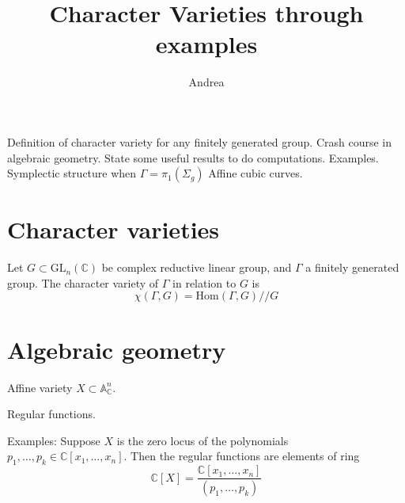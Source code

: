 
% 


\title{Character Varieties through examples}
\author{Andrea}
\date{}

 
\maketitle

Definition of character variety for any finitely generated group. 
Crash course in algebraic geometry.
State some useful results to do computations. 
Examples. 
Symplectic structure when $ \Gamma = \pi_1 ( \Sigma_g) $
Affine cubic curves. 

\section{Character varieties} %

\begin{definition}
    Let $ G \subset \mathrm{GL}_n (\mathbb{C} ) $ be complex reductive linear group, 
    and $ \Gamma $ a finitely generated group. 
    The character variety of $ \Gamma$ in relation to $G$ is 
    \begin{equation}
        \chi ( \Gamma, G) = \mathrm{Hom}( \Gamma, G) // G 
    \end{equation}
\end{definition}


\section{Algebraic geometry} %

\begin{definition}
    Affine variety  $ X \subset \mathbb{A}_\mathbb{C} ^n $.
\end{definition}

\begin{definition}
    Regular functions. 
\end{definition}

Examples: 
Suppose $X$ is the zero locus of the polynomials $p_1, \dots, p_k \in \mathbb{C} [x_1, \dots, x_n ] $. 
Then the regular functions are elements of ring 
\begin{equation}
    \mathbb{C}  [X] = \frac{\mathbb{C} [x_1, \dots, x_n ] }{(p_1, \dots, p_k)}
\end{equation}

